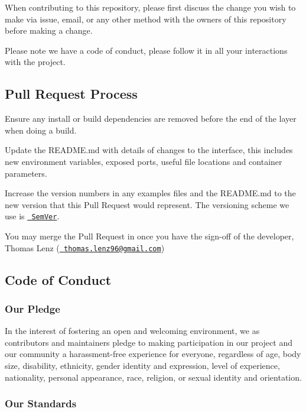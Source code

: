 When contributing to this repository, please first discuss the change you wish to make via issue, email, or any other method with the owners of this repository before making a change.

Please note we have a code of conduct, please follow it in all your interactions with the project.

\subsection*{Pull Request Process}


\begin{DoxyEnumerate}
\item Ensure any install or build dependencies are removed before the end of the layer when doing a build.
\item Update the R\+E\+A\+D\+M\+E.\+md with details of changes to the interface, this includes new environment variables, exposed ports, useful file locations and container parameters.
\item Increase the version numbers in any examples files and the R\+E\+A\+D\+M\+E.\+md to the new version that this Pull Request would represent. The versioning scheme we use is \href{http://semver.org/}{\texttt{ Sem\+Ver}}.
\item You may merge the Pull Request in once you have the sign-\/off of the developer, Thomas Lenz (\href{mailto:thomas.lenz96@gmail.com}{\texttt{ thomas.\+lenz96@gmail.\+com}})
\end{DoxyEnumerate}

\subsection*{Code of Conduct}

\subsubsection*{Our Pledge}

In the interest of fostering an open and welcoming environment, we as contributors and maintainers pledge to making participation in our project and our community a harassment-\/free experience for everyone, regardless of age, body size, disability, ethnicity, gender identity and expression, level of experience, nationality, personal appearance, race, religion, or sexual identity and orientation.

\subsubsection*{Our Standards}

